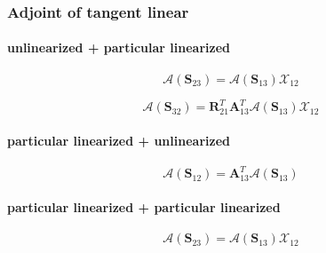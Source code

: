 %
\subsubsection{Adjoint of tangent linear}
\label{sec:adding-downward-adjoint_of_tangent_linear}

\paragraph{unlinearized + particular linearized}
\label{sec:adding-downward-adjoint_of_tangent_linear-unlinearized_p_particular_linearized}

\begin{equation}
\mathcal{A}(\mathbf{S}_{23}) = \mathcal{A}(\mathbf{S}_{13})\mathcal{X}_{12}
\label{eq:adding-downward-adjoint_of_tangent_linear-unlinearized_p_particular_linearized-S23_a}
\end{equation}

\begin{equation}
\mathcal{A}(\mathbf{S}_{32}) = \mathbf{R}^{T}_{21}\mathbf{A}^{T}_{13}\mathcal{A}(\mathbf{S}_{13})\mathcal{X}_{12}
\label{eq:adding-downward-adjoint_of_tangent_linear-unlinearized_p_particular_linearized-S32_a}
\end{equation}


\paragraph{particular linearized + unlinearized}
\label{sec:adding-downward-adjoint_of_tangent_linear-particular_linearized_p_unlinearized}

\begin{equation}
\mathcal{A}(\mathbf{S}_{12}) = \mathbf{A}^{T}_{13}\mathcal{A}(\mathbf{S}_{13})
\label{eq:adding-downward-adjoint_of_tangent_linear-particular_linearized_p_unlinearized-S12_a}
\end{equation}


\paragraph{particular linearized + particular linearized}
\label{sec:adding-downward-adjoint_of_tangent_linear-particular_linearized_p_particular_linearized}

\begin{equation}
\mathcal{A}(\mathbf{S}_{23}) = \mathcal{A}(\mathbf{S}_{13})\mathcal{X}_{12}
\label{eq:adding-downward-adjoint_of_tangent_linear-particular_linearized_p_particular_linearized-S23_a}
\end{equation}

